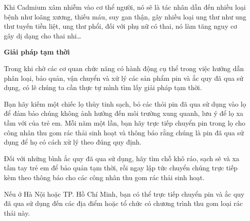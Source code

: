 \begin{enumerate}[label=\bfseries Câu \arabic*:]
{		Khi Cadmium xâm nhiễm vào cơ thể người, nó sẽ là tác nhân dẫn đến nhiều loại bệnh như loãng xương, thiếu máu, suy gan thận, gây nhiều loại ung thư như ung thư tuyến tiền liệt, ung thư phổi, đối với phụ nữ có thai, nó làm tăng nguy cơ gây dị dạng cho thai nhi…
		
		\textbf{Giải pháp tạm thời}
		
		Trong khi chờ các cơ quan chức năng có hành động cụ thể trong việc hướng dẫn phân loại, bảo quản, vận chuyển và xử lý các sản phẩm pin và ắc quy đã qua sử dụng, có lẽ chúng ta cần thực tự mình tìm lấy giải pháp tạm thời.
		
		Bạn hãy kiếm một chiếc lọ thủy tinh sạch, bỏ các thỏi pin đã qua sử dụng vào lọ để đảm bảo chúng không ảnh hưởng đến môi trường xung quanh, lưu ý để lọ xa tầm với của trẻ em. Mỗi năm một lần, bạn hãy trực tiếp chuyển pin trong lọ cho công nhân thu gom rác thải sinh hoạt và thông báo rằng chúng là pin đã qua sử dụng để họ có cách xử lý theo đúng quy định.
		
		Đối với những bình ắc quy đã qua sử dụng, hãy tìm chỗ khô ráo, sạch sẽ và xa tầm tay trẻ em để bảo quản tạm thời, rồi ngay lập tức chuyển chúng trực tiếp kèm theo thông báo cho các công nhân thu gom rác thải sinh hoạt.
		
		Nếu ở Hà Nội hoặc TP. Hồ Chí Minh, bạn có thể trực tiếp chuyển pin và ắc quy đã qua sử dụng đến các địa điểm hoặc tổ chức có chương trình thu gom loại rác thải này.   
	}
\end{enumerate}